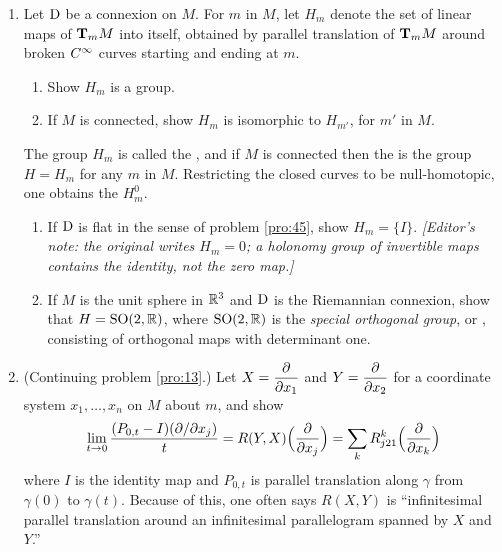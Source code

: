 \documentclass[../main]{subfiles}
\begin{document}
\begin{enumerate}
    \item\label{pro:47} Let $\connection$ be a connexion on $M$. For $m$ in $M$, let $H_m$ denote the set of linear maps of $\tangentspace{M}{m}$ into itself, obtained by parallel translation of $\tangentspace{M}{m}$ around broken $\CInfty$ curves starting and ending at $m$.
    \begin{enumerate}[label = (\roman*)]
        \item Show $H_m$ is a group.
        \item If $M$ is connected, show $H_m$ is isomorphic to $H_{m'}$, for $m'$ in $M$.
    \end{enumerate}
    The group $H_m$ is called the , and if $M$ is connected then the  is the group $H=H_m$ for any $m$ in $M$. Restricting the closed curves to be null-homotopic, one obtains the  $H^0_m$.
    \begin{enumerate}
        \item[(iii)] If $\connection$ is flat in the sense of problem \ref{pro:45}, show $H_m=\{I\}$. \emph{[Editor's note: the original writes $H_m=0$; a holonomy group of invertible maps contains the identity, not the zero map.]}
        \item[(iv)] If $M$ is the unit sphere in $\bR^{3}$ and $\connection$ is the Riemannian connexion, show that $H=\mathrm{SO}(2, \bR)$, where $\mathrm{SO}(2, \bR)$ is the \emph{special orthogonal group}, or , consisting of orthogonal maps with determinant one.
    \end{enumerate}
    

    \item\label{pro:48} (Continuing problem \ref{pro:13}.) Let $X=\pdv{}{x_1}$ and $Y=\pdv{}{x_2}$ for a coordinate system $x_1,\dots,x_n$ on $M$ about $m$, and show \[\lim_{t\to0}\dfrac{(P_{0,t}-I)(\partial/\partial x_j)}{t} = R(Y,X)\Big(\pdv{}{x_j}\Big)=\sum_k R_{j21}^k\Big(\pdv{}{x_k}\Big)\] where $I$ is the identity map and $P_{0,t}$ is parallel translation along $\gamma$ from $\gamma(0)$ to $\gamma(t)$. Because of this, one often says $R(X,Y)$ is ``infinitesimal parallel translation around an infinitesimal parallelogram spanned by $X$ and $Y$.''
\end{enumerate}
\end{document}

